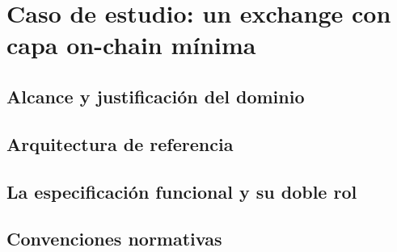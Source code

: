 \chapter{Caso de estudio: un exchange con capa on-chain mínima}\label{cap:caso-de-estudio}


\section{Alcance y justificación del dominio}

\section{Arquitectura de referencia}

\section{La especificación funcional y su doble rol}

\section{Convenciones normativas}
